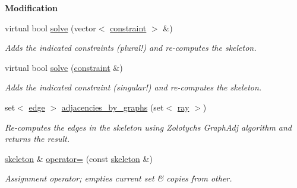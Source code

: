\begin{Indent}\textbf{ Modification}\par
\begin{DoxyCompactItemize}
\item 
virtual bool \hyperlink{group___c_l_s_solvers_ac366952c2b0908159255916a1e37f9b3}{solve} (vector$<$ \hyperlink{group___c_l_s_solvers_classconstraint}{constraint} $>$ \&)
\begin{DoxyCompactList}\small\item\em Adds the indicated constraints (plural!) and re-\/computes the skeleton. \end{DoxyCompactList}\item 
virtual bool \hyperlink{group___c_l_s_solvers_a8add1433d3bc6b1a8588f0f88134599f}{solve} (\hyperlink{group___c_l_s_solvers_classconstraint}{constraint} \&)
\begin{DoxyCompactList}\small\item\em Adds the indicated constraint (singular!) and re-\/computes the skeleton. \end{DoxyCompactList}\item 
\mbox{\label{group___c_l_s_solvers_a1af8c607a3dc93633e0d395e73cb1c97}} 
set$<$ \hyperlink{group___c_l_s_solvers_classedge}{edge} $>$ \hyperlink{group___c_l_s_solvers_a1af8c607a3dc93633e0d395e73cb1c97}{adjacencies\+\_\+by\+\_\+graphs} (set$<$ \hyperlink{group___c_l_s_solvers_classray}{ray} $>$)
\begin{DoxyCompactList}\small\item\em Re-\/computes the edges in the skeleton using Zolotych\textquotesingle{}s {\ttfamily Graph\+Adj} algorithm and returns the result. \end{DoxyCompactList}\item 
\mbox{\label{group___c_l_s_solvers_aa5991e7e25783c2b8cfd772f41f7b99b}} 
\hyperlink{group___c_l_s_solvers_classskeleton}{skeleton} \& \hyperlink{group___c_l_s_solvers_aa5991e7e25783c2b8cfd772f41f7b99b}{operator=} (const \hyperlink{group___c_l_s_solvers_classskeleton}{skeleton} \&)
\begin{DoxyCompactList}\small\item\em Assignment operator; empties current set \& copies from other. \end{DoxyCompactList}\end{DoxyCompactItemize}
\end{Indent}
